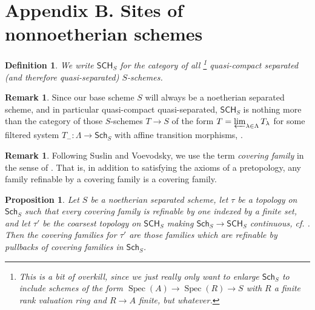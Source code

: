 \documentclass[10pt]{amsart}
\newtheorem{prop}[theo]{Proposition}
\newtheorem{defi}[theo]{Definition}
\theoremstyle{definition}
\newtheorem{rema}[theo]{Remark}
\DeclareMathOperator{\Spec}{Spec}
\newcommand{\Sch}{\mathsf{Sch}}
\newcommand{\SCH}{\mathsf{SCH}}
\begin{document}
\section{Appendix B. Sites of nonnoetherian schemes} \label{sec:nonnoeth}


\begin{defi}
We write $\SCH_S$ for the category of \emph{all}%
\footnote{This is a bit of overkill, since we just really only want to enlarge $\Sch_S$ to include schemes of the form $\Spec(A) {\to} \Spec(R) {\to} S$ with $R$ a finite rank valuation ring and $R \to A$ finite, but whatever. } %
 quasi-compact separated (and therefore quasi-separated) $S$-schemes.
\end{defi}
 
\begin{rema} \label{rema:SCH}
Since our base scheme $S$ will always be a noetherian separated scheme, and in particular quasi-compact quasi-separated, $\SCH_S$ is nothing more than the category of those $S$-schemes $T \to S$ of the form $T = \varprojlim_{\lambda \in \Lambda} T_\lambda$ for some filtered system $T_-: \Lambda \to \Sch_S$ with affine transition morphisms, \cite[Thm.1.1.2]{Tem11}.
\end{rema}

\begin{rema}
Following Suslin and Voevodsky, we use the term \emph{covering family} in the sense of \cite[Exp.II.Def.1.2]{SGA4}. That is, in addition to satisfying the axioms of a pretopology, any family refinable by a covering family is a covering family.
\end{rema}

\begin{prop} \label{prop:inducedSCH}
Let $S$ be a noetherian separated scheme, let $\tau$ be a topology on $\Sch_S$ such that every covering family is refinable by one indexed by a finite set, and let $\tau'$ be the coarsest topology on $\SCH_S$ making $\Sch_S \to \SCH_S$ continuous, cf. \cite[Exp.III.Prop.1.6]{SGA4}. Then the covering families for $\tau'$ are those families which are refinable by pullbacks of covering families in $\Sch_S$.
\end{prop}
\end{document}
